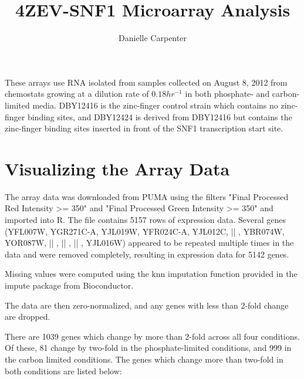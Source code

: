 \documentclass[letter]{article}\usepackage{graphicx, color}
\begin{document}
\title{4ZEV-SNF1 Microarray Analysis}
\author{Danielle Carpenter}

\maketitle

These arrays use RNA isolated from samples collected on August 8, 2012 from chemostats growing at a dilution rate of $0.18 hr^{-1}$ in both phosphate- and carbon-limited media. DBY12416 is the zinc-finger control strain which contains no zinc-finger binding sites, and DBY12424 is derived from DBY12416 but contains the zinc-finger binding sites inserted in front of the SNF1 transcription start site.




\section*{Visualizing the Array Data}


The array data was downloaded from PUMA using the filters "Final Processed Red Intensity >= 350" and "Final Processed Green Intensity >= 350" and imported into R. The file contains 5157 rows of expression data. Several genes (YFL007W, YGR271C-A, YJL019W, YFR024C-A, YJL012C, || , YBR074W, YOR087W, || , || , || , YJL016W) appeared to be repeated multiple times in the data and were removed completely, resulting in expression data for 5142 genes.

Missing values were computed using the knn imputation function provided in the impute package from Bioconductor.



The data are then zero-normalized, and any genes with less than 2-fold change are dropped.


There are 1039 genes which change by more than 2-fold across all four conditions. Of these, 81 change by two-fold in the phosphate-limited conditions, and 999 in the carbon limited conditions. The genes which change more than two-fold in both conditions are listed below:
\end{document}
